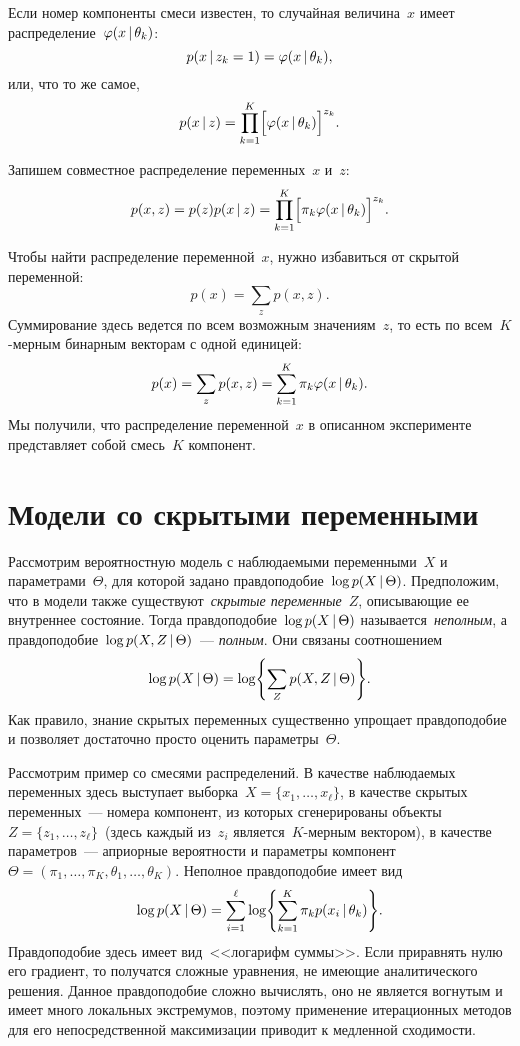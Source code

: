 \documentclass[12pt,fleqn]{article}
\begin{document}
Если номер компоненты смеси известен, то случайная величина~$x$
имеет распределение~$\varphi(x \mspace{3mu}{|}\mspace{3mu} \theta_k)$:
\[
    p(x \mspace{3mu}{|}\mspace{3mu} z_k = 1)
    =
    \varphi(x \mspace{3mu}{|}\mspace{3mu} \theta_k),
\]
или, что то же самое,
\[
    p(x \mspace{3mu}{|}\mspace{3mu} z)
    =
    \prod_{k = 1}^{K}
    \Bigl[
        \varphi(x \mspace{3mu}{|}\mspace{3mu} \theta_k)
    \Bigr]^{z_k}.
\]

Запишем совместное распределение переменных~$x$ и~$z$:
\[
    p(x, z)
    =
    p(z) p(x \mspace{3mu}{|}\mspace{3mu} z)
    =
    \prod_{k = 1}^{K}
    \Bigl[
        \pi_k \varphi(x \mspace{3mu}{|}\mspace{3mu} \theta_k)
    \Bigr]^{z_k}.
\]

Чтобы найти распределение переменной~$x$, нужно избавиться от скрытой переменной:
\[
    p(x)
    =
    \sum_{z} p(x, z).
\]
Суммирование здесь ведется по всем возможным значениям~$z$,
то есть по всем~\mbox{$K$-мерным} бинарным векторам с одной единицей:
\[
    p(x)
    =
    \sum_{z} p(x, z)
    =
    \sum_{k = 1}^{K}
    \pi_k \varphi(x \mspace{3mu}{|}\mspace{3mu} \theta_k).
\]
Мы получили, что распределение переменной~$x$ в описанном эксперименте
представляет собой смесь~$K$ компонент.

\section{Модели со скрытыми переменными}
Рассмотрим вероятностную модель с наблюдаемыми переменными~$X$ и параметрами~$\Theta$,
для которой задано правдоподобие~$\log p(X \mspace{3mu}{|}\mspace{3mu} \Theta)$.
Предположим, что в модели также существуют~\emph{скрытые переменные}~$Z$,
описывающие ее внутреннее состояние.
Тогда правдоподобие~$\log p(X \mspace{3mu}{|}\mspace{3mu} \Theta)$ называется~\emph{неполным},
а правдоподобие~$\log p(X, Z \mspace{3mu}{|}\mspace{3mu} \Theta)$~--- \emph{полным}.
Они связаны соотношением
\[
    \log p(X \mspace{3mu}{|}\mspace{3mu} \Theta)
    =
    \log \Biggl\{
        \sum_{Z} p(X, Z \mspace{3mu}{|}\mspace{3mu} \Theta)
    \Biggr\}.
\]
Как правило, знание скрытых переменных существенно упрощает правдоподобие
и позволяет достаточно просто оценить параметры~$\Theta$.

Рассмотрим пример со смесями распределений.
В качестве наблюдаемых переменных здесь выступает выборка~$X = \{x_1, \dots, x_\ell\}$,
в качестве скрытых переменных~--- номера компонент,
из которых сгенерированы объекты~$Z = \{z_1, \dots, z_\ell\}$~(здесь
каждый из~$z_i$ является~$K$-мерным вектором),
в качестве параметров~--- априорные вероятности и параметры
компонент~$\Theta = (\pi_1, \dots, \pi_K, \theta_1, \dots, \theta_K)$.
Неполное правдоподобие имеет вид
\[
    \log p(X \mspace{3mu}{|}\mspace{3mu} \Theta)
    =
    \sum_{i = 1}^{\ell}
        \log \Biggl\{
            \sum_{k = 1}^{K} \pi_k p(x_i \mspace{3mu}{|}\mspace{3mu} \theta_k)
        \Biggr\}.
\]
Правдоподобие здесь имеет вид~<<логарифм суммы>>.
Если приравнять нулю его градиент, то получатся сложные
уравнения, не имеющие аналитического решения.
Данное правдоподобие сложно вычислять, оно не является вогнутым и имеет много
локальных экстремумов, поэтому применение итерационных методов
для его непосредственной максимизации приводит к медленной сходимости.
\end{document}
